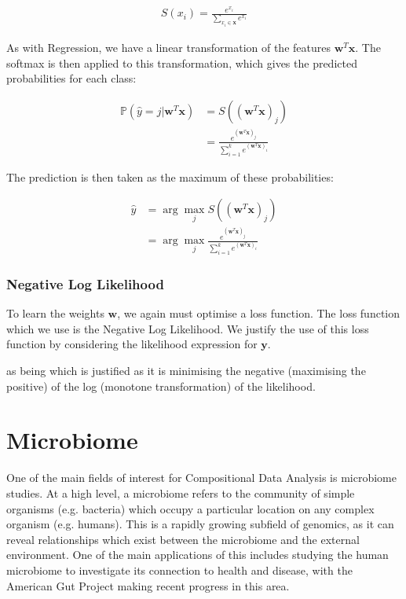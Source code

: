 \begin{align}
   S(x_i) = \frac{e^{x_i}}{\sum_{x_i \in \mathbf{x}}e^{x_i}} 
\end{align}

As with Regression, we have a linear transformation of the features $\mathbf{w}^T\mathbf{x}$. The softmax is then applied to this transformation, which gives the predicted probabilities for each class: 

\begin{align}
   \mathbb{P}(\hat{y} = j | \mathbf{w}^T\mathbf{x}) &= S((\mathbf{w}^T\mathbf{x})_j)\\
   &=  \frac{e^{(\mathbf{w}^T\mathbf{x})_j}}{\sum_{i=1}^{k} e^{(\mathbf{w}^T\mathbf{x})_i}} 
\end{align}

The prediction is then taken as the maximum of these probabilities:

\begin{align}
   \hat{y} &= \arg \max_j S((\mathbf{w}^T\mathbf{x})_j)\\
   &= \arg\max_j \frac{e^{(\mathbf{w}^T\mathbf{x})_j}}{\sum_{i=1}^{k} e^{(\mathbf{w}^T\mathbf{x})_i}} 
\end{align}

\subsubsection{Negative Log Likelihood}
To learn the weights $\mathbf{w}$, we again must optimise a loss function. The loss function which we use is the Negative Log Likelihood. We justify the use of this loss function by considering the likelihood expression for $\mathbf{y}$.  

as being which is justified as it is minimising the negative (maximising the positive) of the log (monotone transformation) of the likelihood. 




\section{Microbiome}
\label{microbiome}
One of the main fields of interest for Compositional Data Analysis is microbiome studies. At a high level, a  microbiome refers to the community of simple organisms (e.g. bacteria) which occupy a particular location on any complex organism (e.g. humans). This is a rapidly growing subfield of genomics, as it can reveal relationships which exist between the microbiome and the external environment. One of the main applications of this includes studying the human microbiome to investigate its connection to health and disease, with the American Gut Project \citep{McDonalde00031-18} making recent progress in this area.

